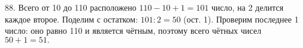 88. Всего от 10 до 110 расположено $110-10+1=101$ число, на 2 делится каждое второе. Поделим с остатком: $101:2=50$ (ост. 1). Проверим последнее 1 число: оно равно 110 и является чётным, поэтому всего чётных чисел $50+1=51.$\\
